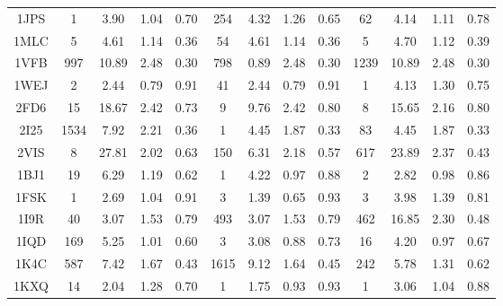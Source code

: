 \begin{longtable}{c c c c c|c c c c|c c c c}
 {\tiny 1JPS} &{\tiny 1}&{\tiny 3.90}&{\tiny 1.04}&{\tiny 0.70} &{\tiny 254}&{\tiny 4.32}&{\tiny 1.26}&{\tiny 0.65} &{\tiny 62}&{\tiny 4.14}&{\tiny 1.11}&{\tiny 0.78}\\ 
 {\tiny 1MLC} &{\tiny 5}&{\tiny 4.61}&{\tiny 1.14}&{\tiny 0.36} &{\tiny 54}&{\tiny 4.61}&{\tiny 1.14}&{\tiny 0.36} &{\tiny 5}&{\tiny 4.70}&{\tiny 1.12}&{\tiny 0.39}\\ 
 {\tiny 1VFB} &{\tiny 997}&{\tiny 10.89}&{\tiny 2.48}&{\tiny 0.30} &{\tiny 798}&{\tiny 0.89}&{\tiny 2.48}&{\tiny 0.30} &{\tiny 1239}&{\tiny 10.89}&{\tiny 2.48}&{\tiny 0.30}\\ 
 {\tiny 1WEJ} &{\tiny 2}&{\tiny 2.44}&{\tiny 0.79}&{\tiny 0.91} &{\tiny 41}&{\tiny 2.44}&{\tiny 0.79}&{\tiny 0.91} &{\tiny 1}&{\tiny 4.13}&{\tiny 1.30}&{\tiny 0.75}\\ 
 {\tiny 2FD6} &{\tiny 15}&{\tiny 18.67}&{\tiny 2.42}&{\tiny 0.73} &{\tiny 9}&{\tiny 9.76}&{\tiny 2.42}&{\tiny 0.80} &{\tiny 8}&{\tiny 15.65}&{\tiny 2.16}&{\tiny 0.80}\\ 
 {\tiny 2I25} &{\tiny 1534}&{\tiny 7.92}&{\tiny 2.21}&{\tiny 0.36} &{\tiny 1}&{\tiny 4.45}&{\tiny 1.87}&{\tiny 0.33} &{\tiny 83}&{\tiny 4.45}&{\tiny 1.87}&{\tiny 0.33}\\ 
 {\tiny 2VIS} &{\tiny 8}&{\tiny 27.81}&{\tiny 2.02}&{\tiny 0.63} &{\tiny 150}&{\tiny 6.31}&{\tiny 2.18}&{\tiny 0.57} &{\tiny 617}&{\tiny 23.89}&{\tiny 2.37}&{\tiny 0.43}\\ 
 {\tiny 1BJ1} &{\tiny 19}&{\tiny 6.29}&{\tiny 1.19}&{\tiny 0.62} &{\tiny 1}&{\tiny 4.22}&{\tiny 0.97}&{\tiny 0.88} &{\tiny 2}&{\tiny 2.82}&{\tiny 0.98}&{\tiny 0.86}\\ 
 {\tiny 1FSK} &{\tiny 1}&{\tiny 2.69}&{\tiny 1.04}&{\tiny 0.91} &{\tiny 3}&{\tiny 1.39}&{\tiny 0.65}&{\tiny 0.93} &{\tiny 3}&{\tiny 3.98}&{\tiny 1.39}&{\tiny 0.81}\\ 
 {\tiny 1I9R} &{\tiny 40}&{\tiny 3.07}&{\tiny 1.53}&{\tiny 0.79} &{\tiny 493}&{\tiny 3.07}&{\tiny 1.53}&{\tiny 0.79} &{\tiny 462}&{\tiny 16.85}&{\tiny 2.30}&{\tiny 0.48}\\ 
 {\tiny 1IQD} &{\tiny 169}&{\tiny 5.25}&{\tiny 1.01}&{\tiny 0.60} &{\tiny 3}&{\tiny 3.08}&{\tiny 0.88}&{\tiny 0.73} &{\tiny 16}&{\tiny 4.20}&{\tiny 0.97}&{\tiny 0.67}\\ 
 {\tiny 1K4C} &{\tiny 587}&{\tiny 7.42}&{\tiny 1.67}&{\tiny 0.43} &{\tiny 1615}&{\tiny 9.12}&{\tiny 1.64}&{\tiny 0.45} &{\tiny 242}&{\tiny 5.78}&{\tiny 1.31}&{\tiny 0.62}\\ 
 {\tiny 1KXQ} &{\tiny 14}&{\tiny 2.04}&{\tiny 1.28}&{\tiny 0.70} &{\tiny 1}&{\tiny 1.75}&{\tiny 0.93}&{\tiny 0.93} &{\tiny 1}&{\tiny 3.06}&{\tiny 1.04}&{\tiny 0.88}\\ 

\end{longtable}
